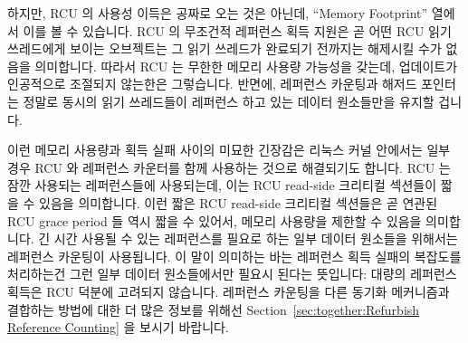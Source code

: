 하지만, RCU 의 사용성 이득은 공짜로 오는 것은 아닌데, ``Memory Footprint''
열에서 이를 볼 수 있습니다.
RCU 의 무조건적 레퍼런스 획득 지원은 곧 어떤 RCU 읽기 쓰레드에게 보이는
오브젝트는 그 읽기 쓰레드가 완료되기 전까지는 해제시킬 수가 없음을 의미합니다.
따라서 RCU 는 무한한 메모리 사용량 가능성을 갖는데, 업데이트가 인공적으로
조절되지 않는한은 그렇습니다.
반면에, 레퍼런스 카운팅과 해저드 포인터는 정말로 동시의 읽기 쓰레드들이
레퍼런스 하고 있는 데이터 원소들만을 유지할 겁니다.
\iffalse

However, RCU's ease-of-use advantage does not come
for free, as can be seen in the ``Memory Footprint'' row.
RCU's support of unconditional reference acquisition means that
it must avoid freeing any object reachable by a given
RCU reader until that reader completes.
RCU therefore has an unbounded memory footprint, at least unless updates
are throttled.
In contrast, reference counting and hazard pointers need to  retain only
those data elements actually referenced by concurrent readers.
\fi

이런 메모리 사용량과 획득 실패 사이의 미묘한 긴장감은 리눅스
커널 안에서는 일부 경우 RCU 와 레퍼런스 카운터를 함께 사용하는 것으로
해결되기도 합니다.
RCU 는 잠깐 사용되는 레퍼런스들에 사용되는데, 이는 RCU read-side 크리티컬
섹션들이 짧을 수 있음을 의미합니다.
이런 짧은 RCU read-side 크리티컬 섹션들은 곧 연관된 RCU grace period 들 역시
짧을 수 있어서, 메모리 사용량을 제한할 수 있음을 의미합니다.
긴 시간 사용될 수 있는 레퍼런스를 필요로 하는 일부 데이터 원소들을 위해서는
레퍼런스 카운팅이 사용됩니다.
이 말이 의미하는 바는 레퍼런스 획득 실패의 복잡도를 처리하는건 그런 일부 데이터
원소들에서만 필요시 된다는 뜻입니다:  대량의 레퍼런스 획득은 RCU 덕분에
고려되지 않습니다.
레퍼런스 카운팅을 다른 동기화 메커니즘과 결합하는 방법에 대한 더 많은 정보를
위해선
Section~\ref{sec:together:Refurbish Reference Counting} 을 보시기 바랍니다.
\iffalse

This tension between memory footprint and acquisition
failures is sometimes resolved within the Linux kernel by combining use
of RCU and reference counters.
RCU is used for short-lived references, which means that RCU read-side
critical sections can be short.
These short RCU read-side critical sections in turn mean that the corresponding
RCU grace periods can also be short, which limits the memory footprint.
For the few data elements that need longer-lived references, reference
counting is used.
This means that the complexity of reference-acquisition failure only
needs to be dealt with for those few data elements:  The bulk of
the reference acquisitions are unconditional, courtesy of RCU.
See Section~\ref{sec:together:Refurbish Reference Counting}
for more information on combining reference counting with other
synchronization mechanisms.
\fi

